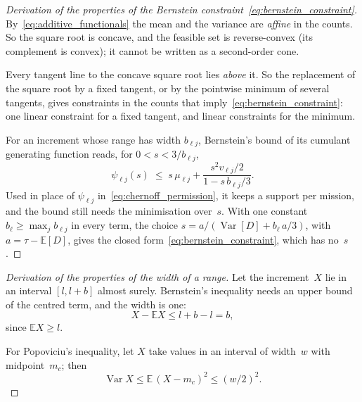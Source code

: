 \documentclass[11pt,a4paper]{article}
\theoremstyle{plain}
\theoremstyle{definition}
\theoremstyle{remark}
\begin{document}
\label{drv:bernstein_curvature}
\begin{proof}[Derivation of the properties of the Bernstein constraint~\eqref{eq:bernstein_constraint}]
By~\eqref{eq:additive_functionals} the mean and the variance are \emph{affine} in the counts.
So the square root is concave, and the feasible set is reverse-convex (its complement is convex); it cannot be written as a second-order cone.

Every tangent line to the concave square root lies \emph{above} it.
So the replacement of the square root by a fixed tangent, or by the pointwise minimum of several tangents, gives constraints in the counts that imply~\eqref{eq:bernstein_constraint}: one linear constraint for a fixed tangent, and linear constraints for the minimum.

For an increment whose range has width $b_{\ell j}$, Bernstein's bound of its cumulant generating function reads, for $0 < s < 3/b_{\ell j}$,
\begin{equation}
  \psi_{\ell j}(s) \;\le\; s\,\mu_{\ell j} + \frac{s^2 v_{\ell j}/2}{1 - s\,b_{\ell j}/3}.
\end{equation}
Used in place of $\psi_{\ell j}$ in~\eqref{eq:chernoff_permission}, it keeps a support per mission, and the bound still needs the minimisation over~$s$.
With one constant $b_\ell \ge \max_j b_{\ell j}$ in every term, the choice $s = a/(\operatorname{Var}[D] + b_\ell\, a/3)$, with $a = \tau - \mathbb{E}[D]$, gives the closed form~\eqref{eq:bernstein_constraint}, which has no~$s$.
\end{proof}

\label{drv:width}
\begin{proof}[Derivation of the properties of the width of a range]
Let the increment~$X$ lie in an interval $[l, l + b]$ almost surely.
Bernstein's inequality needs an upper bound of the centred term, and the width is one:
\begin{equation}
  X - \mathbb{E}X \le l + b - l = b,
\end{equation}
since $\mathbb{E}X \ge l$.

For Popoviciu's inequality, let $X$ take values in an interval of width~$w$ with midpoint~$m_c$; then
\begin{equation}
  \operatorname{Var} X \le \mathbb{E}\,(X - m_c)^2 \le (w/2)^2.
\end{equation}
\end{proof}
\end{document}
